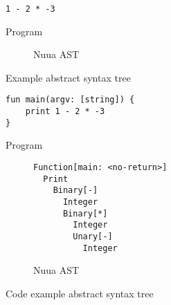 \begin{slide}
    \begin{figure}[H]
        \centering
        \begin{subtable}{0.45\textwidth}
            \begin{verbatim}
1 - 2 * -3
            \end{verbatim}
            \caption{Program}
        \end{subtable}
        \begin{subfigure}{0.45\textwidth}
            \centering
            \caption{Nuua AST}
        \end{subfigure}
        \caption{Example abstract syntax tree}
    \end{figure}
\end{slide}

\begin{slide}
    \begin{figure}[H]
        \centering
        \begin{subtable}{0.5\textwidth}
            \begin{verbatim}
fun main(argv: [string]) {
    print 1 - 2 * -3
}
            \end{verbatim}
            \caption{Program}
        \end{subtable}
        \begin{subfigure}{0.45\textwidth}
            \centering
            \begin{verbatim}
Function[main: <no-return>]
  Print
    Binary[-]
      Integer
      Binary[*]
        Integer
        Unary[-]
          Integer
            \end{verbatim}
            \caption{Nuua AST}
        \end{subfigure}
        \caption{Code example abstract syntax tree}
    \end{figure}
\end{slide}
